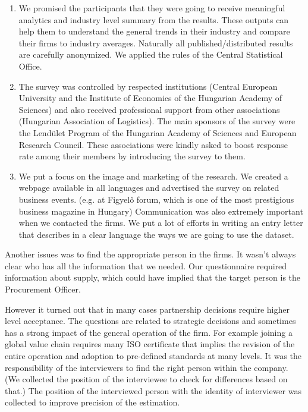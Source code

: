 \documentclass[final, dvipsnames, authoryear,12pt]{elsarticle}
\begin{document}
\begin{enumerate}
    \item  We promised the participants that they were going to receive meaningful analytics and industry level summary from the results. These outputs can help them to understand the general trends in their industry and compare their firms to industry averages. Naturally all published/distributed results are carefully anonymized. We applied the rules of the Central Statistical Office.

    \item  The survey was controlled by respected institutions (Central European University and the Institute of Economics of the Hungarian Academy of Sciences) and also received professional support from other associations (Hungarian Association of Logistics). The main sponsors of the survey were the Lendület Program of the Hungarian Academy of Sciences and European Research Council. These associations were kindly asked to boost response rate among their members by introducing the survey to them.

    \item  We put a focus on the image and marketing of the research. We created a webpage available in all languages and advertised the survey on related business events. (e.g. at Figyelő forum, which is one of the most prestigious business magazine in Hungary) Communication was also extremely important when we contacted the firms. We put a lot of efforts in writing an entry letter that describes in a clear language the ways we are going to use the dataset.

\end{enumerate}


Another issues was to find the appropriate person in the firms. It wasn’t always clear who has all the information that we needed. Our questionnaire required information about supply, which could have implied that the target person is the Procurement Officer. 

However it turned out that in many cases partnership decisions require higher level acceptance. The questions are related to strategic decisions and sometimes has a strong impact of the general operation of the firm. For example joining a global value chain requires many ISO certificate that implies the revision of the entire operation and adoption to pre-defined standards at many levels. It was the responsibility of the interviewers to find the right person within the company. (We collected the position of the interviewee to check for differences based on that.) The position of the interviewed person with the identity of interviewer was collected to improve precision of the estimation.
\end{document}
